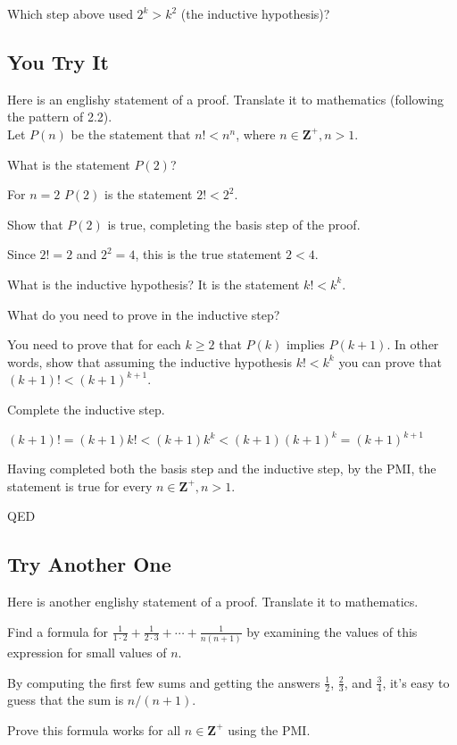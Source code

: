 \documentclass[12pt]{amsart}
\begin{document}
Which step above used $2^k > k^2$ (the inductive hypothesis)?

\subsection{You Try It}
Here is an englishy statement of a proof. Translate it to mathematics (following the pattern of 2.2).\\

Let $P(n)$ be the statement that $n! < n^n$, where $n \in \mathbf Z^{+}, n > 1$.

What is the statement $P(2)$?

For $n = 2$ $P(2)$ is the statement $2! < 2^2$.

Show that $P(2)$ is true, completing the basis step of the proof.

Since $2! = 2$ and $2^2 = 4$, this is the true statement $2 < 4$.

What is the inductive hypothesis? It is the statement $k! < k^k$.

What do you need to prove in the inductive step?

You need to prove that for each $k \ge 2$ that $P(k)$ implies
$P(k + 1)$.  In other words, show that assuming the inductive
hypothesis $k! < k^k$ you can prove that $(k + 1)! < (k + 1)^{k + 1}$.

Complete the inductive step.

$(k + 1)! = (k + 1)k! < (k + 1)k^k < (k + 1)(k + 1)^k = (k + 1)^{k + 1}$

Having completed both the basis step and the inductive step, by the
PMI, the statement is true for every $n \in \mathbf Z^{+}, n > 1$.

QED

\subsection{Try Another One}Here is another englishy statement of a proof. Translate it to mathematics.

Find a formula for $\frac{1}{1 \cdot 2} + \frac{1}{2 \cdot 3} +
\cdots + \frac{1}{n(n + 1)}$ by examining the values of this
expression for small values of $n$.

By computing the first few sums and getting the answers $\frac{1}{2}$, $\frac{2}{3}$,
and $\frac{3}{4}$, it's easy to guess that the sum is $n/(n + 1)$.

Prove this formula works for all $n \in \mathbf Z^{+}$ using the PMI.
\end{document}
